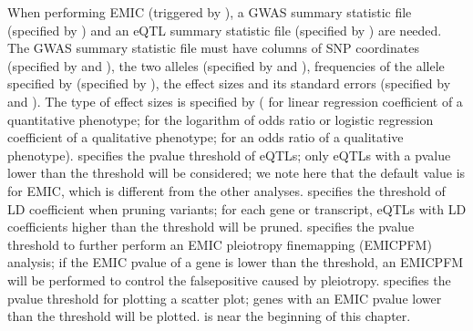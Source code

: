 \documentclass[letterpaper,10pt,english,openany,oneside]{sphinxmanual}
\begin{document}
\sphinxAtStartPar
When performing EMIC (triggered by ), a GWAS summary statistic file (specified by ) and an eQTL summary statistic file (specified by ) are needed. The GWAS summary statistic file must have columns of SNP coordinates (specified by  and ), the two alleles (specified by  and ), frequencies of the allele specified by  (specified by ), the effect sizes and its standard errors (specified by  and ). The type of effect sizes is specified by  ( for linear regression coefficient of a quantitative phenotype;  for the logarithm of odds ratio or logistic regression coefficient of a qualitative phenotype;  for an odds ratio of a qualitative phenotype).  specifies the p\sphinxhyphen{}value threshold of eQTLs; only eQTLs with a p\sphinxhyphen{}value lower than the threshold will be considered; we note here that the default value is  for EMIC, which is different from the other analyses.  specifies the threshold of LD coefficient when pruning variants; for each gene or transcript, eQTLs with LD coefficients higher than the threshold will be pruned.  specifies the p\sphinxhyphen{}value threshold to further perform an EMIC pleiotropy fine\sphinxhyphen{}mapping (EMIC\sphinxhyphen{}PFM) analysis; if the EMIC p\sphinxhyphen{}value of a gene is lower than the threshold, an EMIC\sphinxhyphen{}PFM will be performed to control the false\sphinxhyphen{}positive caused by pleiotropy.  specifies the p\sphinxhyphen{}value threshold for plotting a scatter plot; genes with an EMIC p\sphinxhyphen{}value lower than the threshold will be plotted. {\hyperref[\detokenize{detailed_document:eqtl-file}]{}} is near the beginning of this chapter.
\end{document}
